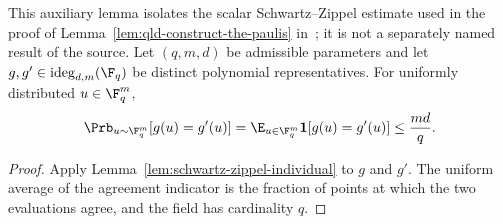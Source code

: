 \begin{lemma}
\label{lem:qld-poly-eval-collision}
	\leanok
	This auxiliary lemma isolates the scalar Schwartz--Zippel estimate used in
	the proof of Lemma~\ref{lem:qld-construct-the-paulis}
	in~\cite{Ji2020MIPStar}; it is not a separately named result of the source.
	Let $(q,m,d)$ be admissible parameters and let
	$g,g'\in\mathrm{ideg}_{d,m}(\F_q)$ be distinct polynomial representatives.
	For uniformly distributed $u\in\F_q^m$,
	\[
		\Prb_{u\sim\F_q^m}[g(u)=g'(u)]
		=\E_{u\in\F_q^m}\mathbf{1}[g(u)=g'(u)]
		\leq\frac{md}{q}.
	\]
\end{lemma}
\begin{proof}
	\leanok
	Apply Lemma~\ref{lem:schwartz-zippel-individual} to $g$ and $g'$.
	The uniform average of the agreement indicator is the fraction of points
	at which the two evaluations agree, and the field has cardinality $q$.
\end{proof}

